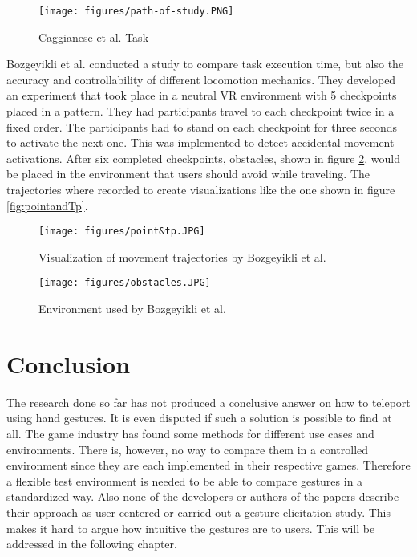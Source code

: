 \begin{figure}[hbt!]
  \centering
  \texttt{[image: figures/path-of-study.PNG]}
  \caption{Caggianese et al. \cite{Caggianese} Task}
  \label{fig:path}
\end{figure}

Bozgeyikli et al. \cite{bozgeyikli} conducted a study to compare task execution time, but also the accuracy and controllability of different locomotion mechanics. They developed an experiment that took place in a neutral VR environment with 5 checkpoints placed in a pattern. They had participants travel to each checkpoint twice in a fixed order. The participants had to stand on each checkpoint for three seconds to activate the next one. This was implemented to detect accidental movement activations. After six completed checkpoints, obstacles, shown in figure \ref{fig:obstacles}, would be placed in the environment that users should avoid while traveling. The trajectories where recorded to create visualizations like the one shown in figure \ref{fig:pointandTp}.

\begin{figure}[!h]
      \texttt{[image: figures/point\&tp.JPG]}
      \caption{Visualization of movement trajectories by Bozgeyikli et al. \cite{bozgeyikli}}
      \label{fig:pointandTp}
  \endminipage\hfill
      \texttt{[image: figures/obstacles.JPG]}
      \caption{Environment used by Bozgeyikli et al. \cite{bozgeyikli}}
      \label{fig:obstacles}
  \endminipage\hfill
\end{figure}

\section{Conclusion}
The research done so far has not produced a conclusive answer on how to teleport using hand gestures. It is even disputed if such a solution is possible to find at all. The game industry has found some methods for different use cases and environments. There is, however, no way to compare them in a controlled environment since they are each implemented in their respective games. Therefore a flexible test environment is needed to be able to compare gestures in a standardized way. Also none of the developers or authors of the papers describe their approach as user centered or carried out a gesture elicitation study. This makes it hard to argue how intuitive the gestures are to users. This will be addressed in the following chapter. 

